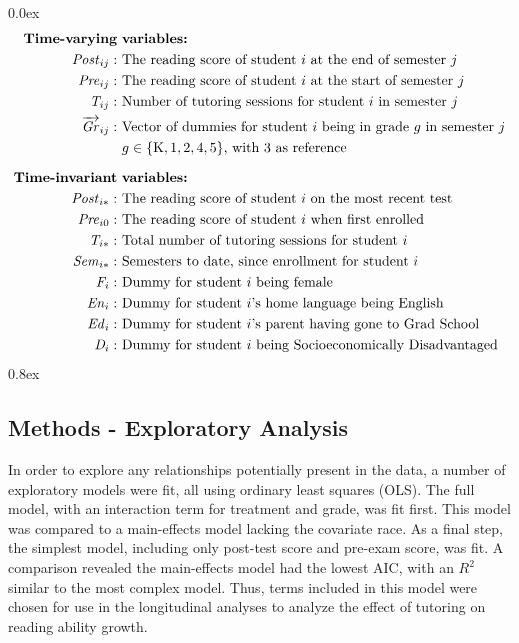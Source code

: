 \documentclass[a0,landscape]{a0poster}
\begin{document}
\begin{multicols}{3}
\parskip 0.0ex
\begin{align*}
\text{\textbf{Time-varying}} & \text{ \textbf{variables:}} \\
\mathit{Post}_{ij}: & \text{ The reading score of student } i \text{ at the end of semester } j \\
\mathit{Pre}_{ij}: & \text{ The reading score of student } i \text{ at the start of semester } j \\
\mathit{T}_{ij}: & \text{ Number of tutoring sessions for student } i  \text{ in semester } j \\
\overrightarrow{\mathit{Gr}}_{ij}: & \text{ Vector of dummies for student } i 
      \text{ being in grade } g \text{ in semester } j \\
  & ~ g \in \{\mathrm{K}, 1, 2, 4, 5\} \text {, with 3 as reference}  \\[1.5ex]
\text{\textbf{Time-invariant}} & \text{ \textbf{variables:}} \\
\mathit{Post}_{i*}: & \text{ The reading score of student } i \text{ on the most recent test } \\
\mathit{Pre}_{i0}: & \text{ The reading score of student } i \text{ when first enrolled } \\
\mathit{T}_{i*}: & \text{ Total number of tutoring sessions for student } i \\
\mathit{Sem}_{i*}: & \text{ Semesters to date, since enrollment for student } i \\
\mathit{F}_{i}: & \text{ Dummy for student } i  \text{ being female } \\ 
\mathit{En}_{i}: & \text{ Dummy for student } i \text{'s home language being English } \\ 
\mathit{Ed}_{i}: & \text{ Dummy for student } i \text{'s parent having gone to Grad School} \\ 
\mathit{D}_{i}: & \text{ Dummy for student } i \text{ being Socioeconomically Disadvantaged } \\ 
\end{align*}
\parskip 0.8ex

\subsection*{Methods - Exploratory Analysis}

In order to explore any relationships potentially present
in the data, a number of exploratory models were fit,
all using ordinary least squares (OLS).
The full model, with an interaction term for treatment and grade,
was fit first. This model was compared to a main-effects model
lacking the covariate race.
As a final step, the simplest model, including only
post-test score and pre-exam score, was fit.
A comparison revealed the main-effects model had the lowest AIC,
with an $R^{2}$ similar to the most complex model.
Thus, terms included in this model were chosen for use in the
longitudinal analyses to analyze the effect of tutoring on
reading ability growth.


\end{multicols}
\end{document}
